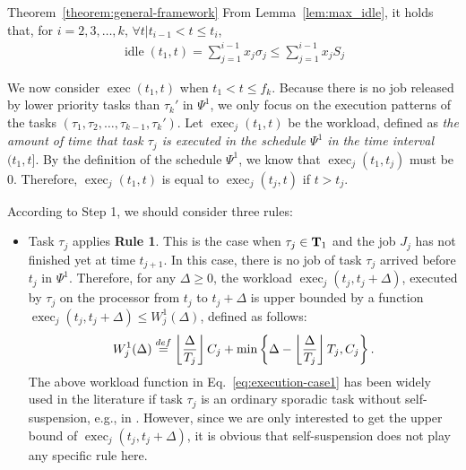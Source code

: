 \begin{appProof}{Theorem~\ref{theorem:general-framework}}
From Lemma~\ref{lem:max_idle}, it holds that, for $i=2,3,\ldots,k$, $\forall t | t_{i-1} < t \leq t_i$, 
\begin{align}
\label{eq:sumof-sigma}
\operatorname{idle}(t_1, t) = \sum_{j=1}^{i-1} x_j \sigma_j \leq
  \sum_{j=1}^{i-1} x_j S_j
\end{align}

%


We now consider $\operatorname{exec}(t_1, t)$ when $t_1 < t \leq f_k$.
Because there is no job released by lower priority tasks than
$\tau_k'$ in $\Psi^1$, we only focus on the execution patterns of the
tasks $(\tau_1, \tau_2, \ldots, \tau_{k-1}, \tau_k')$. Let
$\operatorname{exec}_j(t_1, t)$ be the workload, defined as \emph{the
  amount of time that task $\tau_j$ is executed in the schedule
  $\Psi^1$ in the time interval $(t_1, t]$}. By the definition of the
schedule $\Psi^1$, we know that $\operatorname{exec}_j(t_1, t_j)$ must
be $0$. Therefore, $\operatorname{exec}_j(t_1, t)$ is equal to
$\operatorname{exec}_j(t_j, t)$ if $t > t_j$.

According to Step 1, we should consider three rules:
\begin{itemize}
\item Task $\tau_j$ applies {\bf Rule 1}. This is the case when
  $\tau_j \in {\bf T}_1$ and the job $J_j$ has not finished yet at
  time $t_{j+1}$. In this case, there is no job of task $\tau_j$
  arrived before $t_j$ in $\Psi^1$.  Therefore, for any $\Delta \geq
  0$, the workload $\operatorname{exec}_j(t_j, t_j+\Delta)$, executed by $\tau_j$ on the
  processor from $t_j$ to $t_j+\Delta$ is upper bounded by a function $\operatorname{exec}_j(t_j, t_j+\Delta)  \leq W_j^1(\Delta)$, defined as follows:
{\footnotesize \begin{equation}
  \label{eq:execution-case1}
  W_j^1(\Delta) \stackrel{\mbox{def}}{=} \floor{\frac{\Delta}{T_j}}C_j + \min\left\{\Delta-\floor{\frac{\Delta}{T_j}}T_j, C_j\right\}.
\end{equation}}The above workload function in Eq.~\eqref{eq:execution-case1} has been widely used in the literature if task $\tau_j$ is an ordinary sporadic task without self-suspension, e.g., in \cite{bertogna2006new}. However, since we are only interested to get the upper bound  of $\operatorname{exec}_j(t_j, t_j+\Delta)$, it is obvious that self-suspension does not play any specific rule here.


\end{itemize}
\end{appProof}
